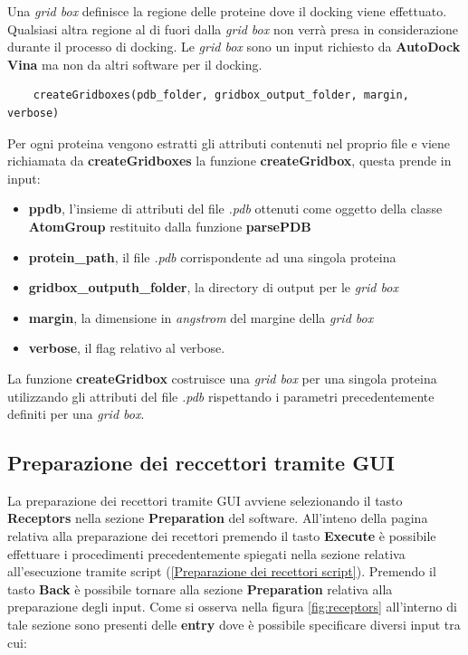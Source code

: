 Una \textit{grid box} definisce la regione delle proteine dove il docking viene effettuato. Qualsiasi altra regione al di fuori dalla \textit{grid box} non verrà presa in considerazione durante il processo di docking.\newline
Le \textit{grid box} sono un input richiesto da \textbf{AutoDock Vina} ma non da altri software per il docking.\newline

\begin{verbatim}
    createGridboxes(pdb_folder, gridbox_output_folder, margin, verbose)
\end{verbatim}

Per ogni proteina vengono estratti gli attributi contenuti nel proprio file e viene richiamata da \textbf{createGridboxes} la funzione \textbf{createGridbox}, questa prende in input: 

\begin{itemize}    
    \item \textbf{ppdb}, l'insieme di attributi del file \textit{.pdb} ottenuti come oggetto della classe \textbf{AtomGroup} restituito dalla funzione \textbf{parsePDB}
    \item \textbf{protein\_path}, il file \textit{.pdb} corrispondente ad una singola proteina
    \item \textbf{gridbox\_outputh\_folder}, la directory di output per le \textit{grid box}
    \item \textbf{margin}, la dimensione in \textit{angstrom} del margine della \textit{grid box}
    \item \textbf{verbose}, il flag relativo al verbose.
\end{itemize}

La funzione \textbf{createGridbox} costruisce una \textit{grid box} per una singola proteina utilizzando gli attributi del file \textit{.pdb} rispettando i parametri precedentemente definiti per una \textit{grid box}.

\subsection{Preparazione dei reccettori tramite GUI}
La preparazione dei recettori tramite GUI avviene selezionando il tasto \textbf{Receptors} nella sezione \textbf{Preparation} del software. All'inteno della pagina relativa alla preparazione dei recettori premendo il tasto \textbf{Execute} è possibile effettuare i procedimenti precedentemente spiegati nella sezione relativa all'esecuzione tramite script (\ref{Preparazione dei recettori script}). Premendo il tasto \textbf{Back} è possibile tornare alla sezione \textbf{Preparation} relativa alla preparazione degli input.
Come si osserva nella figura \ref{fig:receptors} all'interno di tale sezione sono presenti delle \textbf{entry} dove è possibile specificare diversi input tra cui:

